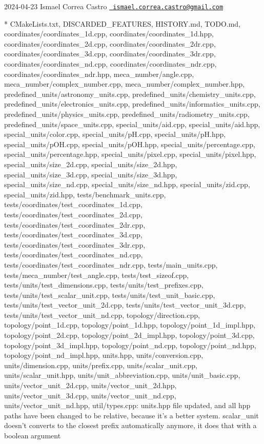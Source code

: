  2024-\/04-\/23 Ismael Correa Castro \href{mailto:ismael.correa.castro@gmail.com}{\texttt{ ismael.\+correa.\+castro@gmail.\+com}} \begin{DoxyVerb}* CMakeLists.txt, DISCARDED_FEATURES, HISTORY.md, TODO.md,
coordinates/coordinates_1d.cpp, coordinates/coordinates_1d.hpp,
coordinates/coordinates_2d.cpp, coordinates/coordinates_2dr.cpp,
coordinates/coordinates_3d.cpp, coordinates/coordinates_3dr.cpp,
coordinates/coordinates_nd.cpp, coordinates/coordinates_ndr.cpp,
coordinates/coordinates_ndr.hpp, meca_number/angle.cpp,
meca_number/complex_number.cpp, meca_number/complex_number.hpp,
predefined_units/astronomy_units.cpp,
predefined_units/chemistry_units.cpp,
predefined_units/electronics_units.cpp,
predefined_units/informatics_units.cpp,
predefined_units/physics_units.cpp,
predefined_units/radiometry_units.cpp,
predefined_units/space_units.cpp, special_units/aid.cpp,
special_units/aid.hpp, special_units/color.cpp,
special_units/pH.cpp, special_units/pH.hpp, special_units/pOH.cpp,
special_units/pOH.hpp, special_units/percentage.cpp,
special_units/percentage.hpp, special_units/pixel.cpp,
special_units/pixel.hpp, special_units/size_2d.cpp,
special_units/size_2d.hpp, special_units/size_3d.cpp,
special_units/size_3d.hpp, special_units/size_nd.cpp,
special_units/size_nd.hpp, special_units/zid.cpp,
special_units/zid.hpp, tests/benchmark_units.cpp,
tests/coordinates/test_coordinates_1d.cpp,
tests/coordinates/test_coordinates_2d.cpp,
tests/coordinates/test_coordinates_2dr.cpp,
tests/coordinates/test_coordinates_3d.cpp,
tests/coordinates/test_coordinates_3dr.cpp,
tests/coordinates/test_coordinates_nd.cpp,
tests/coordinates/test_coordinates_ndr.cpp, tests/main_units.cpp,
tests/meca_number/test_angle.cpp, tests/test_sizeof.cpp,
tests/units/test_dimensions.cpp, tests/units/test_prefixes.cpp,
tests/units/test_scalar_unit.cpp, tests/units/test_unit_basic.cpp,
tests/units/test_vector_unit_2d.cpp,
tests/units/test_vector_unit_3d.cpp,
tests/units/test_vector_unit_nd.cpp, topology/direction.cpp,
topology/point_1d.cpp, topology/point_1d.hpp,
topology/point_1d_impl.hpp, topology/point_2d.cpp,
topology/point_2d_impl.hpp, topology/point_3d.cpp,
topology/point_3d_impl.hpp, topology/point_nd.cpp,
topology/point_nd.hpp, topology/point_nd_impl.hpp, units.hpp,
units/conversion.cpp, units/dimension.cpp, units/prefix.cpp,
units/scalar_unit.cpp, units/scalar_unit.hpp,
units/unit_abbreviation.cpp, units/unit_basic.cpp,
units/vector_unit_2d.cpp, units/vector_unit_2d.hpp,
units/vector_unit_3d.cpp, units/vector_unit_nd.cpp,
units/vector_unit_nd.hpp, util/types.cpp: units.hpp file updated,
and all hpp paths have been changed to be relative, because it's a
better system. scalar_unit doesn't converts to the closest prefix
automatically anymore, it does that with a boolean argument
\end{DoxyVerb}
